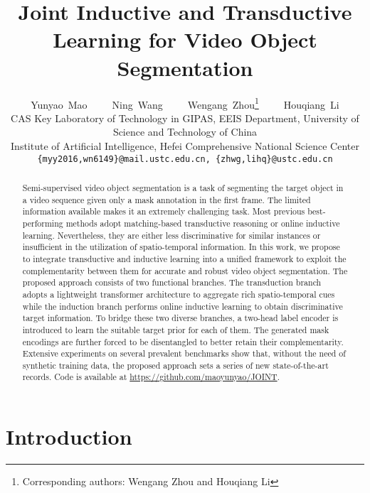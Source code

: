 \documentclass[10pt,twocolumn,letterpaper]{article}
\begin{document}
\title{Joint Inductive and Transductive Learning for Video Object Segmentation}

\author{Yunyao~Mao~~~~~Ning~Wang~~~~~Wengang~Zhou\thanks{Corresponding authors: Wengang Zhou and Houqiang Li}~~~~~Houqiang~Li\footnotemark[1] \\
	{\normalsize  CAS Key Laboratory of Technology in GIPAS, EEIS Department, University of Science and Technology of China} \\
	{\normalsize  Institute of Artificial Intelligence, Hefei Comprehensive National Science Center} \\
	{\tt\small \{myy2016,wn6149\}@mail.ustc.edu.cn, \{zhwg,lihq\}@ustc.edu.cn}
}

\maketitle
\ificcvfinal\thispagestyle{empty}\fi

\begin{abstract}
Semi-supervised video object segmentation is a task of segmenting the target object in a video sequence given only a mask annotation in the first frame. The limited information available makes it an extremely challenging task. Most previous best-performing methods adopt matching-based transductive reasoning or online inductive learning. Nevertheless, they are either less discriminative for similar instances or insufficient in the utilization of spatio-temporal information. In this work, we propose to integrate transductive and inductive learning into a unified framework to exploit the complementarity between them for accurate and robust video object segmentation. The proposed approach consists of two functional branches. The transduction branch adopts a lightweight transformer architecture to aggregate rich spatio-temporal cues while the induction branch performs online inductive learning to obtain discriminative target information.
To bridge these two diverse branches, a two-head label encoder is introduced to learn the suitable target prior for each of them. The generated mask encodings are further forced to be disentangled to better retain their complementarity. 
Extensive experiments on several prevalent benchmarks show that, without the need of synthetic training data, the proposed approach sets a series of new state-of-the-art records. Code is available at \url{https://github.com/maoyunyao/JOINT}.
\end{abstract}

\section{Introduction}
\end{document}
